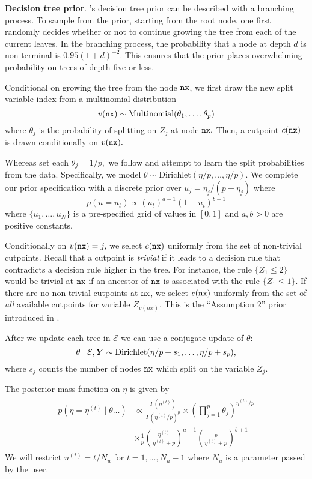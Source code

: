 \textbf{Decision tree prior}. \citet{Chipman1998}'s decision tree prior can be described with a branching process.
To sample from the prior, starting from the root node, one first randomly decides whether or not to continue growing the tree from each of the current leaves. 
In the branching process, the probability that a node at depth $d$ is non-terminal is $0.95(1 + d)^{-2}.$
This ensures that the prior places overwhelming probability on trees of depth five or less.

Conditional on growing the tree from the node $\texttt{nx}$, we first draw the new split variable index from a multinomial distribution
$$
v(\texttt{nx}) \sim \text{Multinomial}(\theta_{1}, \ldots, \theta_{p})
$$
where $\theta_{j}$ is the probability of splitting on $Z_{j}$ at node $\texttt{nx}.$
Then, a cutpoint $c(\texttt{nx})$ is drawn conditionally on $v(\texttt{nx}).$

Whereas \citet{Chipman2010} set each $\theta_{j} = 1/p,$ we follow \citet{Linero2018} and attempt to learn the split probabilities from the data.
Specifically, we model $\theta \sim \text{Dirichlet}(\eta/p, \ldots, \eta/p).$
We complete our prior specification with a discrete prior over $u_{j} = \eta_{j}/(p + \eta_{j})$ where
$$
p(u = u_{t}) \propto (u_{t})^{a-1}(1 - u_{t})^{b-1}
$$
where $\{u_{1}, \ldots, u_{N}\}$ is a pre-specified grid of values in $[0,1]$ and $a,b > 0$ are positive constants.

Conditionally on $v(\texttt{nx}) = j,$ we select $c(\texttt{nx})$ uniformly from the set of non-trivial cutpoints.
Recall that a cutpoint is \textit{trivial} if it leads to a decision rule that contradicts a decision rule higher in the tree.
For instance, the rule $\{Z_{1} \leq 2 \}$ would be trivial at $\texttt{nx}$ if an ancestor of $\texttt{nx}$ is associated with the rule $\{Z_{1} \leq 1\}.$
If there are no non-trivial cutpoints at $\texttt{nx}$, we select $c(\texttt{nx})$ uniformly from the set of \textit{all} available cutpoints for variable $Z_{v(nx)}.$ 
This is the ``Assumption 2'' prior introduced in \citet{Linero2018}.

After we update each tree in $\mathcal{E}$ we can use a conjugate update of $\theta$:
$$
\theta \mid \mathcal{E}, \bm{Y} \sim \text{Dirichlet}(\eta/p + s_{1}, \ldots, \eta/p + s_{p}),
$$
where $s_{j}$ counts the number of nodes $\texttt{nx}$ which split on the variable $Z_{j}.$

The posterior mass function on $\eta$ is given by
\begin{align}
\begin{split}
p(\eta = \eta^{(t)} \mid \theta \ldots) &\propto \frac{\Gamma(\eta^{(t)})}{\Gamma(\eta^{(t)}/p)^{p}} \times \left(\prod_{j = 1}^{p}{\theta_{j}}\right)^{\eta^{(t)}/p} \\
&\times \frac{1}{p}\left(\frac{\eta^{(t)}}{\eta^{(t)} + p}\right)^{a-1}\left(\frac{p}{\eta^{(t)} + p}\right)^{b+1}
\end{split}
\end{align}
We will restrict $u^{(t)} = t/N_{u}$ for $t = 1, \ldots, N_{u} - 1$ where $N_{u}$ is a parameter passed by the user.

